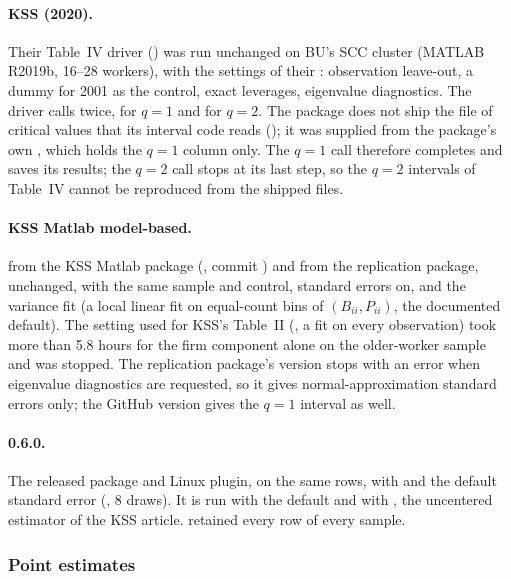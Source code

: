 \paragraph{KSS (2020).} Their Table~IV driver () was run unchanged on BU's SCC cluster
(MATLAB R2019b, 16--28 workers), with the settings of their : observation leave-out, a
dummy for 2001 as the control, exact leverages, eigenvalue diagnostics. The driver calls
 twice, for $q=1$ and for $q=2$. The package does not ship the file of critical
values that its interval code reads (); it was supplied from the package's own
, which holds the $q=1$ column only. The $q=1$ call therefore completes and
saves its results; the $q=2$ call stops at its last step, so the $q=2$ intervals of Table~IV cannot be
reproduced from the shipped files.

\paragraph{KSS Matlab model-based.}  from the KSS Matlab package
(, commit ) and from the replication package, unchanged, with the same
sample and control, standard errors on, and the variance fit  (a local linear
fit on equal-count bins of $(B_{ii},P_{ii})$, the documented default). The setting used for KSS's Table~II
(, a fit on every observation) took more than 5.8 hours for the firm
component alone on the older-worker sample and was stopped. The replication package's version stops with
an error when eigenvalue diagnostics are requested, so it gives normal-approximation standard errors only;
the GitHub version gives the $q=1$ interval as well.

\paragraph{\fevc{} 0.6.0.} The released package and Linux plugin, on the same rows, with
 and the default
standard error (, 8 draws). It is run with the default  and
with , the uncentered estimator of the KSS article. \fevc{} retained every row of
every sample.

\subsubsection{Point estimates}\label{kss:sec:emp-point}

